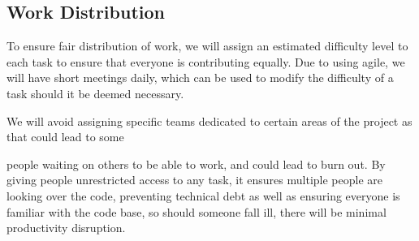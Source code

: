 \subsection{Work Distribution}
To ensure fair distribution of work, we will assign an estimated difficulty level to each task to ensure that
everyone is contributing equally. Due to using agile, we will have short meetings daily, which can be used to
modify the difficulty of a task should it be deemed necessary.
\par
We will avoid assigning specific teams dedicated to certain areas of the project as that could lead to some‪‬

people waiting on others to be able to work, and could lead to burn out. By giving people unrestricted access
to any task, it ensures multiple people are looking over the code, preventing technical debt as well as ensuring
everyone is familiar with the code base, so should someone fall ill, there will be minimal productivity disruption.

